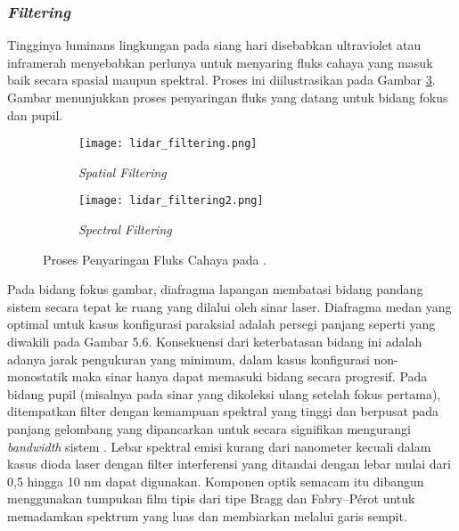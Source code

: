 \subsubsection{\textit{Filtering}}
\label{subsec: Filtering}
Tingginya luminans lingkungan pada siang hari disebabkan ultraviolet atau inframerah menyebabkan perlunya untuk menyaring fluks cahaya yang masuk baik secara spasial maupun spektral. Proses ini diilustrasikan pada Gambar \ref*{fig:Ch02_filter_lidar}. Gambar menunjukkan proses penyaringan fluks yang datang untuk bidang fokus dan pupil.
\begin{figure}[H]
    \centering
    \begin{subfigure}[b]{.40\textwidth}\texttt{[image: lidar\_filtering.png]}\caption{\textit{Spatial Filtering}}\label{Fig:Ch02_lidar_filtering1}\end{subfigure}
    \begin{subfigure}[b]{.40\textwidth}\texttt{[image: lidar\_filtering2.png]}\caption{\textit{Spectral Filtering}}\label{Fig:Ch02_lidar_filtering2}\end{subfigure}
    \caption{Proses Penyaringan Fluks Cahaya pada \lidar\cite{bs9}.}
    \label{fig:Ch02_filter_lidar}
\end{figure}
Pada bidang fokus gambar, diafragma lapangan membatasi bidang pandang sistem secara tepat ke ruang yang dilalui oleh sinar laser. Diafragma medan yang optimal untuk kasus konfigurasi paraksial adalah persegi panjang seperti yang diwakili pada Gambar 5.6. Konsekuensi dari keterbatasan bidang ini adalah adanya jarak pengukuran yang minimum, dalam kasus konfigurasi non-monostatik maka sinar hanya dapat memasuki bidang secara progresif.
Pada bidang pupil (misalnya pada sinar yang dikoleksi ulang setelah fokus pertama), ditempatkan filter dengan kemampuan spektral yang tinggi dan berpusat pada panjang gelombang yang dipancarkan untuk secara signifikan mengurangi \textit{bandwidth} sistem \lidar. Lebar spektral emisi kurang dari nanometer kecuali dalam kasus dioda laser dengan filter interferensi yang ditandai dengan lebar mulai dari 0,5 hingga 10 nm dapat digunakan. Komponen optik semacam itu dibangun menggunakan tumpukan film tipis dari tipe Bragg dan Fabry–Pérot untuk memadamkan spektrum yang luas dan membiarkan melalui garis sempit. 
